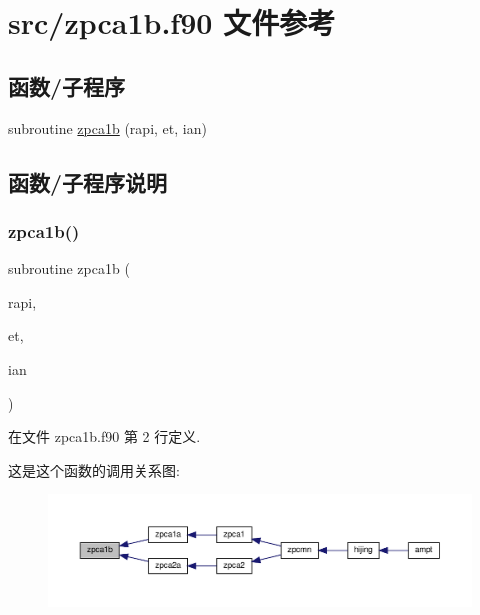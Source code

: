\hypertarget{zpca1b_8f90}{}\section{src/zpca1b.f90 文件参考}
\label{zpca1b_8f90}
\subsection*{函数/子程序}
\begin{DoxyCompactItemize}
\item 
subroutine \mbox{\hyperlink{zpca1b_8f90_a9964fb8b00c166a9bc24bc2d73d1420d}{zpca1b}} (rapi, et, ian)
\end{DoxyCompactItemize}


\subsection{函数/子程序说明}
\mbox{\label{zpca1b_8f90_a9964fb8b00c166a9bc24bc2d73d1420d}} 
\subsubsection{\texorpdfstring{zpca1b()}{zpca1b()}}
{\footnotesize\ttfamily subroutine zpca1b (\begin{DoxyParamCaption}\item[{}]{rapi,  }\item[{}]{et,  }\item[{}]{ian }\end{DoxyParamCaption})}



在文件 zpca1b.\+f90 第 2 行定义.

这是这个函数的调用关系图\+:
\nopagebreak
\begin{figure}[H]
\begin{center}
\leavevmode
\includegraphics[width=350pt]{zpca1b_8f90_a9964fb8b00c166a9bc24bc2d73d1420d_icgraph}
\end{center}
\end{figure}
